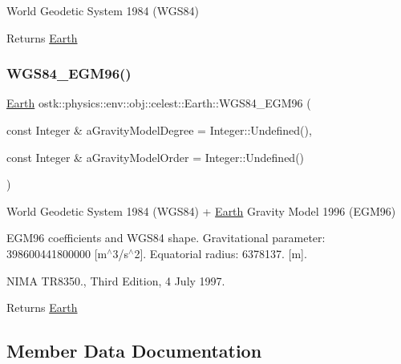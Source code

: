 World Geodetic System 1984 (W\+G\+S84) 

\begin{DoxyReturn}{Returns}
\hyperlink{classostk_1_1physics_1_1env_1_1obj_1_1celest_1_1_earth}{Earth} 
\end{DoxyReturn}
\mbox{\label{classostk_1_1physics_1_1env_1_1obj_1_1celest_1_1_earth_ae424f9430a33064680675a93825dcf8b}} 
\subsubsection{\texorpdfstring{W\+G\+S84\+\_\+\+E\+G\+M96()}{WGS84\_EGM96()}}
{\footnotesize\ttfamily \hyperlink{classostk_1_1physics_1_1env_1_1obj_1_1celest_1_1_earth}{Earth} ostk\+::physics\+::env\+::obj\+::celest\+::\+Earth\+::\+W\+G\+S84\+\_\+\+E\+G\+M96 (\begin{DoxyParamCaption}\item[{const Integer \&}]{a\+Gravity\+Model\+Degree = {\ttfamily Integer\+:\+:Undefined()},  }\item[{const Integer \&}]{a\+Gravity\+Model\+Order = {\ttfamily Integer\+:\+:Undefined()} }\end{DoxyParamCaption})\hspace{0.3cm}{\ttfamily [static]}}



World Geodetic System 1984 (W\+G\+S84) + \hyperlink{classostk_1_1physics_1_1env_1_1obj_1_1celest_1_1_earth}{Earth} Gravity Model 1996 (E\+G\+M96) 

E\+G\+M96 coefficients and W\+G\+S84 shape. Gravitational parameter\+: 398600441800000 \mbox{[}m$^\wedge$3/s$^\wedge$2\mbox{]}. Equatorial radius\+: 6378137. \mbox{[}m\mbox{]}.

N\+I\+MA T\+R8350., Third Edition, 4 July 1997.

\begin{DoxyReturn}{Returns}
\hyperlink{classostk_1_1physics_1_1env_1_1obj_1_1celest_1_1_earth}{Earth} 
\end{DoxyReturn}


\subsection{Member Data Documentation}
\mbox{\label{classostk_1_1physics_1_1env_1_1obj_1_1celest_1_1_earth_a51d8f851ef1f2c199dbf7707d9843eb4}} 
